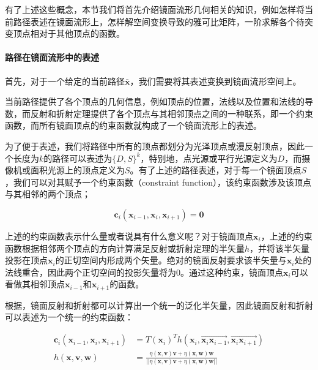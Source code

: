 有了上述这些概念，本节我们将首先介绍镜面流形几何相关的知识，例如怎样将当前路径表述在镜面流形上，怎样解空间变换导致的雅可比矩阵，一阶求解各个待突变顶点相对于其他顶点的函数。




\paragraph{路径在镜面流形中的表述}
首先，对于一个给定的当前路径$\bar{\mathbf{x}}$，我们需要将其表述变换到镜面流形空间上。

当前路径提供了各个顶点的几何信息，例如顶点的位置，法线以及位置和法线的导数，而反射和折射定理提供了各个顶点与其相邻顶点之间的一种联系，即一个约束函数，而所有镜面顶点的约束函数就构成了一个镜面流形上的表述。

为了便于表述，我们将路径中所有的顶点都划分为光泽顶点或漫反射顶点，因此一个长度为$k$的路径可以表述为$\{D,S\}^{k}$，特别地，点光源或平行光源定义为$D$，而摄像机或面积光源上的顶点定义为$S$。有了上述的路径表述，对于每一个镜面顶点$S$，我们可以对其赋予一个约束函数（constraint function），该约束函数涉及该顶点与其相邻的两个顶点；

\begin{equation}\label{e:mlt-constraint-function}
	\mathbf{c}_i(\mathbf{x}_{i-1},\mathbf{x}_i,\mathbf{x}_{i+1})=\mathbf{0}
\end{equation}

\noindent 上述的约束函数表示什么量或者说具有什么意义呢？对于镜面顶点$\mathbf{x}_i$，上述的约束函数根据相邻两个顶点的方向计算满足反射或折射定理的半矢量$h$，并将该半矢量投影在顶点$\mathbf{x}_i$的正切空间内形成两个矢量。绝对的镜面反射要求该半矢量与$\mathbf{x}_i$处的法线重合，因此两个正切空间的投影矢量将为$0$。通过这种约束，镜面顶点$\mathbf{x}_i$可以看做其相邻顶点$\mathbf{x}_{i-1}$和$\mathbf{x}_{i+1}$的函数。

根据\cite{a:Microfacetmodelsforrefractionthroughroughsurfaces}，镜面反射和折射都可以计算出一个统一的泛化半矢量，因此镜面反射和折射可以表述为一个统一的约束函数：

\begin{equation}\label{e:mlt-constraint-function-and-half-vector}
\begin{aligned}
	\mathbf{c}_i(\mathbf{x}_{i-1},\mathbf{x}_i,\mathbf{x}_{i+1})&=T(\mathbf{x}_i)^{T}h(\mathbf{x}_i,\overrightarrow{\mathbf{x}_i\mathbf{x}_{i-1}},\overrightarrow{\mathbf{x}_i\mathbf{x}_{i+1}})\\
	h(\mathbf{x},\mathbf{v},\mathbf{w})&=\frac{\eta(\mathbf{x},\mathbf{v})\mathbf{v}+\eta(\mathbf{x},\mathbf{w})\mathbf{w}}{||\eta(\mathbf{x},\mathbf{v})\mathbf{v}+\eta(\mathbf{x},\mathbf{w})\mathbf{w}||}
\end{aligned}
\end{equation}


